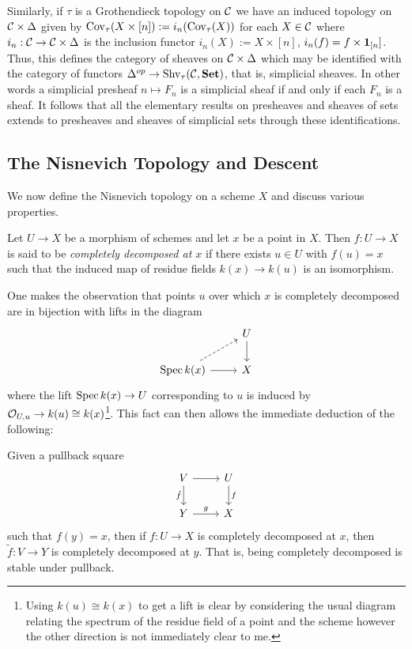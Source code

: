 \documentclass[12pt]{article}
\numberwithin{equation}{section}
\numberwithin{lemma}{section}
\numberwithin{theorem}{section}
\numberwithin{proposition}{section}
\numberwithin{corollary}{section}
\numberwithin{definition}{section}
\numberwithin{example}{section}
\numberwithin{remark}{section}
\begin{document}
Similarly, if $\tau$ is a Grothendieck topology on $\CC$ we have an
induced topology on $\CC \times \Delta$ given by
$\Cov_{\tau}(X \times [n]) := i_n(\Cov_\tau(X))$ for each $X \in \CC$
where $i_n : \CC \to \CC \times \Delta$ is the inclusion functor
$i_n(X) := X \times [n]$, $i_n(f) = f \times \id[[n]]$. Thus, this
defines the category of sheaves on $\CC \times \Delta$ which may be
identified with the category of functors
$\Delta^{op} \to \Shv_\tau(\CC, \Set)$, that is, simplicial
sheaves. In other words a simplicial presheaf $n \mapsto F_n$ is a
simplicial sheaf if and only if each $F_n$ is a sheaf. It follows that
all the elementary results on presheaves and sheaves of sets extends
to presheaves and sheaves of simplicial sets through these
identifications.

\subsection{The Nisnevich Topology and Descent}

We now define the Nisnevich topology on a scheme $X$ and discuss
various properties.

\begin{definition}
  Let $U \to X$ be a morphism of schemes and let $x$ be a point in
  $X$. Then $f : U \to X$ is said to be \emph{completely decomposed at
    $x$} if there exists $u \in U$ with $f(u) = x$ such that the
  induced map of residue fields $k(x) \to k(u)$ is an isomorphism.
\end{definition}

One makes the observation that points $u$ over which $x$ is completely
decomposed are in bijection with lifts in the diagram
\begin{equation*}\label{eq:lift-condition}
  \begin{tikzcd}
    & U \arrow[d] \\
    \Spec k(x) \arrow[r] \arrow[ru, dashed] & X
  \end{tikzcd}
\end{equation*}
where the lift $\Spec k(x) \to U$ corresponding to $u$ is induced by
$\OO_{U, u} \to k(u) \cong k(x)$\footnote{Using $k(u) \cong k(x)$ to
  get a lift is clear by considering the usual diagram relating the
  spectrum of the residue field of a point and the scheme however the
  other direction is not immediately clear to me.}.
This fact can then allows the immediate deduction of the following:
\begin{lemma}
  Given a pullback square
  \begin{equation*}
    \begin{tikzcd}
      V \arrow[d, "\tilde{f}"'] \arrow[r] & U \arrow[d, "f"] \\
      Y \arrow[r, "g"]      & X
    \end{tikzcd}
  \end{equation*}
  such that $f(y) = x$, then if $f : U \to X$ is completely decomposed
  at $x$, then $\tilde{f} : V \to Y$ is completely decomposed at
  $y$. That is, being completely decomposed is stable under pullback.
\end{lemma}
\end{document}
